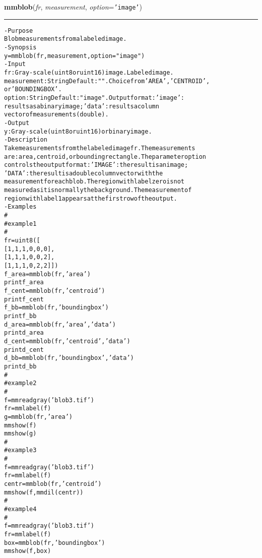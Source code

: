     \begin{boxedminipage}{\textwidth}

    \raggedright \textbf{mmblob}(\textit{fr}, \textit{measurement}, \textit{option}=\texttt{'\-i\-m\-a\-g\-e\-'\-})

    \vspace{-1.5ex}

    \rule{\textwidth}{0.5\fboxrule}
\begin{alltt}
- Purpose
    Blob measurements from a labeled image.
- Synopsis
    y = mmblob(fr, measurement, option="image")
- Input
    fr:          Gray-scale (uint8 or uint16) image. Labeled image.
    measurement: String Default: "". Choice from 'AREA', 'CENTROID',
                 or 'BOUNDINGBOX'.
    option:      String Default: "image". Output format: 'image':
                 results as a binary image; 'data': results a column
                 vector of measurements (double).
- Output
    y: Gray-scale (uint8 or uint16) or binary image.
- Description
    Take measurements from the labeled image fr . The measurements
    are: area, centroid, or bounding rectangle. The parameter option
    controls the output format: 'IMAGE': the result is an image;
    'DATA': the result is a double column vector with the
    measurement for each blob. The region with label zero is not
    measured as it is normally the background. The measurement of
    region with label 1 appears at the first row of the output.
- Examples
    \#
    \#   example 1
    \#
    fr=uint8([
       [1,1,1,0,0,0],
       [1,1,1,0,0,2],
       [1,1,1,0,2,2]])
    f\_area=mmblob(fr,'area')
    print f\_area
    f\_cent=mmblob(fr,'centroid')
    print f\_cent
    f\_bb=mmblob(fr,'boundingbox')
    print f\_bb
    d\_area=mmblob(fr,'area','data')
    print d\_area
    d\_cent=mmblob(fr,'centroid','data')
    print d\_cent
    d\_bb=mmblob(fr,'boundingbox','data')
    print d\_bb
    \#
    \#   example 2
    \#
    f=mmreadgray('blob3.tif')
    fr=mmlabel(f)
    g=mmblob(fr,'area')
    mmshow(f)
    mmshow(g)
    \#
    \#   example 3
    \#
    f=mmreadgray('blob3.tif')
    fr=mmlabel(f)
    centr=mmblob(fr,'centroid')
    mmshow(f,mmdil(centr))
    \#
    \#   example 4
    \#
    f=mmreadgray('blob3.tif')
    fr=mmlabel(f)
    box=mmblob(fr,'boundingbox')
    mmshow(f,box)\end{alltt}

    \vspace{1ex}

    \end{boxedminipage}

